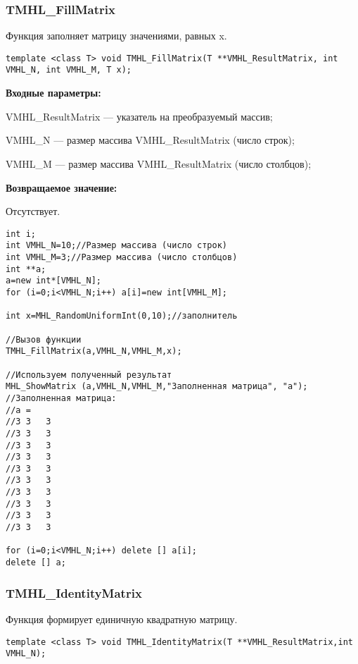 \documentclass[a4paper,12pt]{article}
\begin{document}
\subsubsection{TMHL\_FillMatrix}\label{TMHL_FillMatrix}

Функция заполняет матрицу значениями, равных x.


\begin{lstlisting}[label=code_syntax_TMHL_FillMatrix,caption=Синтаксис]
template <class T> void TMHL_FillMatrix(T **VMHL_ResultMatrix, int VMHL_N, int VMHL_M, T x);
\end{lstlisting}

\textbf{Входные параметры:}

 VMHL\_ResultMatrix --- указатель на преобразуемый массив;
 
 VMHL\_N --- размер массива VMHL\_ResultMatrix (число строк);
 
 VMHL\_M --- размер массива VMHL\_ResultMatrix (число столбцов);

\textbf{Возвращаемое значение:}

Отсутствует.


\begin{lstlisting}[label=code_use_TMHL_FillMatrix,caption=Пример использования]
int i;
int VMHL_N=10;//Размер массива (число строк)
int VMHL_M=3;//Размер массива (число столбцов)
int **a;
a=new int*[VMHL_N];
for (i=0;i<VMHL_N;i++) a[i]=new int[VMHL_M];

int x=MHL_RandomUniformInt(0,10);//заполнитель

//Вызов функции
TMHL_FillMatrix(a,VMHL_N,VMHL_M,x);

//Используем полученный результат
MHL_ShowMatrix (a,VMHL_N,VMHL_M,"Заполненная матрица", "a");
//Заполненная матрица:
//a =	
//3	3	3
//3	3	3
//3	3	3
//3	3	3
//3	3	3
//3	3	3
//3	3	3
//3	3	3
//3	3	3
//3	3	3

for (i=0;i<VMHL_N;i++) delete [] a[i];
delete [] a;
\end{lstlisting}

\subsubsection{TMHL\_IdentityMatrix}\label{TMHL_IdentityMatrix}

Функция формирует единичную квадратную матрицу.


\begin{lstlisting}[label=code_syntax_TMHL_IdentityMatrix,caption=Синтаксис]
template <class T> void TMHL_IdentityMatrix(T **VMHL_ResultMatrix,int VMHL_N);
\end{lstlisting}
\end{document}
